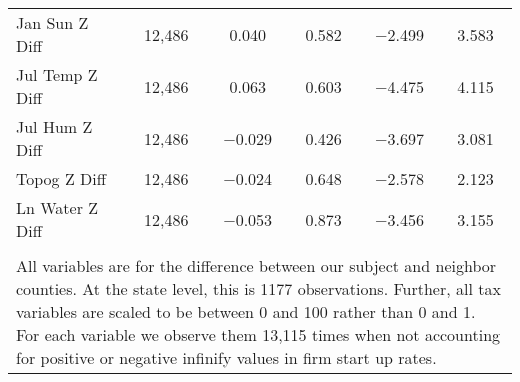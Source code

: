 \begin{table}[!htbp]
\begin{tabular}{@{\extracolsep{5pt}}lccccc}
Jan Sun Z Diff & 12,486 & 0.040 & 0.582 & $-$2.499 & 3.583 \\ 
Jul Temp Z Diff & 12,486 & 0.063 & 0.603 & $-$4.475 & 4.115 \\ 
Jul Hum Z Diff & 12,486 & $-$0.029 & 0.426 & $-$3.697 & 3.081 \\ 
Topog Z Diff & 12,486 & $-$0.024 & 0.648 & $-$2.578 & 2.123 \\ 
Ln Water Z Diff & 12,486 & $-$0.053 & 0.873 & $-$3.456 & 3.155 \\ 
\hline \\[-1.8ex] 
\multicolumn{6}{l}{All variables are for the difference between our subject and neighbor counties. At the state level, this is 1177 observations. Further, all tax variables are scaled to be between 0 and 100 rather than 0 and 1. For each variable we observe them 13,115 times when not accounting for positive or negative infinify values in firm start up rates.} \\ 
\end{tabular} 
\end{table} 
